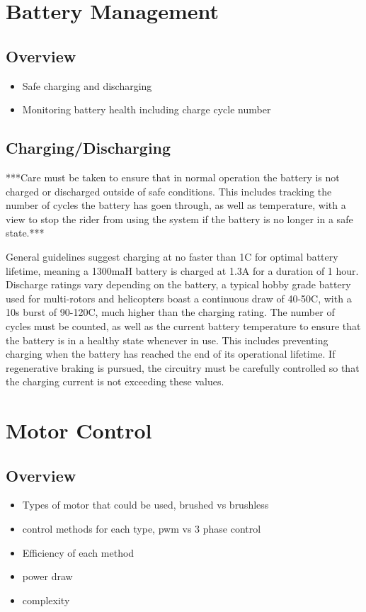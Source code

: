 \documentclass[journal,10pt]{IEEEtran}
\begin{document}
\section{Battery Management}
	\subsection{Overview}
		\begin{itemize}
			\item Safe charging and discharging 
			\item Monitoring battery health including charge cycle number
		\end{itemize}
	\subsection{Charging/Discharging}
	***Care must be taken to ensure that in normal operation the battery is not charged or discharged outside of safe conditions.
	This includes tracking the number of cycles the battery has goen through, as well as temperature, with a view to stop the rider from using the system if the battery is no longer in a safe state.***
	
		General guidelines suggest charging at no faster than 1C for optimal battery lifetime, meaning a 1300maH battery is charged at 1.3A for a duration of 1 hour.
		Discharge ratings vary depending on the battery, a typical hobby grade battery used for multi-rotors and helicopters boast a continuous draw of 40-50C, with a 10s burst of 90-120C, much higher than the charging rating.
		The number of cycles must be counted, as well as the current battery temperature to ensure that the battery is in a healthy state whenever in use.
		This includes preventing charging when the battery has reached the end of its operational lifetime.
		If regenerative braking is pursued, the circuitry must be carefully controlled so that the charging current is not exceeding these values.
\section{Motor Control}
	\subsection{Overview}
		\begin{itemize}
			\item Types of motor that could be used, brushed vs brushless
			\item control methods for each type, pwm vs 3 phase control
			\item Efficiency of each method
			\item power draw
			\item complexity
		\end{itemize}
\end{document}
